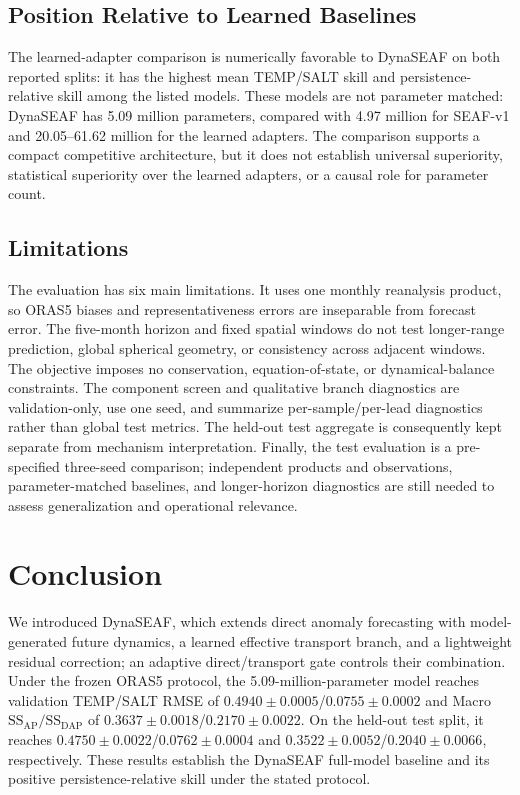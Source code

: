 \documentclass[conference]{IEEEtran}
\begin{document}
\subsection{Position Relative to Learned Baselines}
The learned-adapter comparison is numerically favorable to DynaSEAF on both reported splits: it has the highest mean TEMP/SALT skill and persistence-relative skill among the listed models. These models are not parameter matched: DynaSEAF has 5.09 million parameters, compared with 4.97 million for SEAF-v1 and 20.05--61.62 million for the learned adapters. The comparison supports a compact competitive architecture, but it does not establish universal superiority, statistical superiority over the learned adapters, or a causal role for parameter count.

\subsection{Limitations}
The evaluation has six main limitations. It uses one monthly reanalysis product, so ORAS5 biases and representativeness errors are inseparable from forecast error. The five-month horizon and fixed spatial windows do not test longer-range prediction, global spherical geometry, or consistency across adjacent windows. The objective imposes no conservation, equation-of-state, or dynamical-balance constraints. The component screen and qualitative branch diagnostics are validation-only, use one seed, and summarize per-sample/per-lead diagnostics rather than global test metrics. The held-out test aggregate is consequently kept separate from mechanism interpretation. Finally, the test evaluation is a pre-specified three-seed comparison; independent products and observations, parameter-matched baselines, and longer-horizon diagnostics are still needed to assess generalization and operational relevance.

\section{Conclusion}

We introduced DynaSEAF, which extends direct anomaly forecasting with model-generated future dynamics, a learned effective transport branch, and a lightweight residual correction; an adaptive direct/transport gate controls their combination. Under the frozen ORAS5 protocol, the 5.09-million-parameter model reaches validation TEMP/SALT RMSE of $0.4940\pm0.0005$/$0.0755\pm0.0002$ and Macro $\mathrm{SS}_{\mathrm{AP}}/\mathrm{SS}_{\mathrm{DAP}}$ of $0.3637\pm0.0018$/$0.2170\pm0.0022$. On the held-out test split, it reaches $0.4750\pm0.0022$/$0.0762\pm0.0004$ and $0.3522\pm0.0052$/$0.2040\pm0.0066$, respectively. These results establish the DynaSEAF full-model baseline and its positive persistence-relative skill under the stated protocol.
\end{document}
